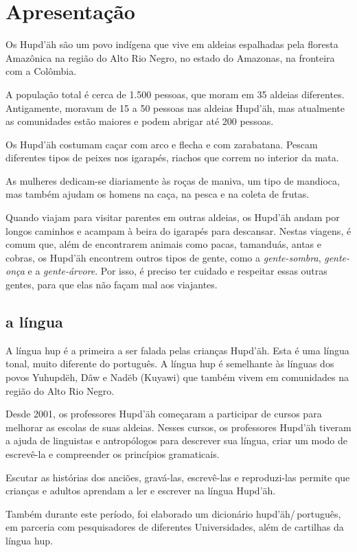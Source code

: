 \chapter{Apresentação}

Os Hupd’äh são um povo indígena que vive em aldeias espalhadas pela floresta Amazônica na região do Alto Rio Negro, no estado do Amazonas, na fronteira com a Colômbia.

A população total é cerca de 1.500 pessoas, que moram em 35 aldeias diferentes. Antigamente, moravam de 15 a 50 pessoas nas aldeias Hupd’äh, mas atualmente as comunidades estão maiores e podem abrigar até 200 pessoas.

Os Hupd’äh costumam caçar com arco e flecha e com zarabatana. Pescam diferentes tipos de peixes nos igarapés, riachos que correm no interior da mata.

As mulheres dedicam-se diariamente às roças de maniva, um tipo de mandioca, mas também ajudam os homens na caça, na pesca e na coleta de frutas.

Quando viajam para visitar parentes em outras aldeias, os Hupd’äh andam por longos caminhos e acampam à beira do igarapés para descansar. Nestas viagens, é comum que, além de encontrarem animais como pacas, tamanduás, antas e cobras, os Hupd’äh encontrem outros tipos de gente, como a \textit{gente-sombra}, \textit{gente-onça} e a \textit{gente-árvore}. Por isso, é preciso ter cuidado e respeitar essas outras gentes, para que elas não façam mal aos viajantes.

\section{a língua}

A língua hup é a primeira a ser falada pelas crianças Hupd’äh. Esta é uma língua tonal, muito
diferente do português. A língua hup é semelhante às línguas dos povos Yuhupdëh,
Dâw e Nadëb (Kuyawi) que também vivem em comunidades na região do Alto Rio Negro.

Desde 2001, os professores Hupd’äh começaram a participar de cursos para melhorar as
escolas de suas aldeias. Nesses cursos, os professores Hupd’äh tiveram a ajuda de linguistas e antropólogos para descrever sua língua, criar um modo de escrevê-la e compreender os princípios gramaticais.

Escutar as histórias dos anciões, gravá-las, escrevê-las e reproduzi-las permite que
crianças e adultos aprendam a ler e escrever na língua Hupd’äh.

Também durante este período, foi elaborado um dicionário hupd’äh/\,português, em parceria
com pesquisadores de diferentes Universidades, além de cartilhas da língua hup.
